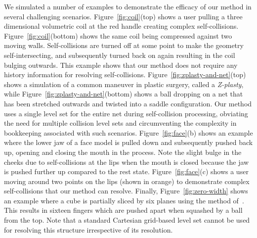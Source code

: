 We simulated a number of examples to demonstrate the efficacy of our
method in several challenging scenarios.
%
Figure~\ref{fig:coil}(top) shows a user pulling a three dimensional
volumetric coil at the red handle creating complex
self-collisions. Figure~\ref{fig:coil}(bottom) shows the same coil
being compressed against two moving walls. Self-collisions are turned
off at some point to make the geometry self-intersecting, and
subsequently turned back on again resulting in the coil bulging
outwards. This example shows that our method does not require any
history information for resolving self-collisions.
%
Figure~\ref{fig:zplasty-and-net}(top) shows a simulation of a common
maneuver in plastic surgery, called a \emph{Z-plasty}, while
Figure~\ref{fig:zplasty-and-net}(bottom) shows a ball dropping on a
net that has been stretched outwards and twisted into a saddle
configuration. Our method uses a single level set for the entire net
during self-collision processing, obviating the need for multiple
collision level sets and circumventing the complexity in bookkeeping
associated with such scenarios.
%
Figure~\ref{fig:face}(b) shows an example where the lower jaw of a
face model is pulled down and subsequently pushed back up, opening and
closing the mouth in the process. Note the slight bulge in the cheeks
due to self-collisions at the lips when the mouth is closed because
the jaw is pushed further up compared to the rest state.
Figure~\ref{fig:face}(c) shows a user moving around two points on the
lips (shown in orange) to demonstrate complex self-collisions that our
method can resolve.
%
Finally, Figure~\ref{fig:zero-width} shows an example where a cube is
partially sliced by six planes using the method
of~\cite{SifakDF:2007}. This results in sixteen fingers which are
pushed apart when squashed by a ball from the top. Note that a
standard Cartesian grid-based level set cannot be used for resolving
this structure irrespective of its resolution.



\renewcommand{\arraystretch}{.8}
\setlength{\tabcolsep}{3pt}


